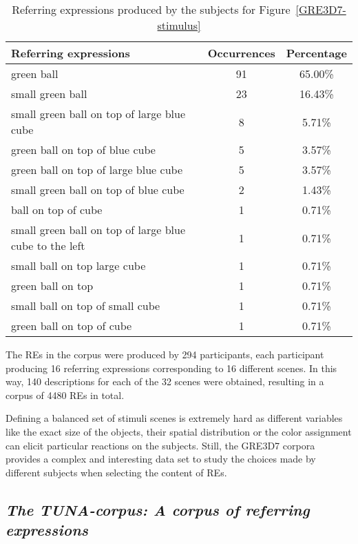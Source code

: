 \begin{table}[h!]
\begin{center}
\begin{tabular}{|l|c|c|}
\hline
Referring expressions & Occurrences & Percentage \\
\hline
green ball & 91 & 65.00\% \\
small green ball & 23 & 16.43\% \\
small green ball on top of large blue cube & 8 & 5.71\% \\
green ball on top of blue cube & 5 & 3.57\% \\
green ball on top of large blue cube & 5 & 3.57\% \\
small green ball on top of blue cube & 2 & 1.43\% \\
ball on top of cube & 1 & 0.71\% \\
small green ball on top of large blue cube to the left & 1 & 0.71\% \\
small ball on top large cube & 1 & 0.71\% \\
green ball on top & 1 & 0.71\% \\
small ball on top of small cube & 1 & 0.71\% \\
green ball on top of cube & 1 & 0.71\% \\
\hline
\end{tabular}
\caption{Referring expressions produced by the subjects for Figure~\ref{GRE3D7-stimulus}\label{corpus-distribution}}
\end{center}
\end{table}

The REs in the corpus were produced by 294 participants, each participant producing 16 referring expressions corresponding to 16 
different scenes. In this way, 140 descriptions for each of the 32 scenes were obtained, resulting in a corpus of 4480 REs in total. 

Defining a balanced set of stimuli scenes is extremely hard as different variables like the exact size of the objects, their 
spatial distribution or the color assignment can elicit particular reactions on the subjects.  Still, the GRE3D7 corpora provides
 a complex and interesting data set to study the choices made by different subjects when selecting the content of REs. 

\subsection{\textit{The TUNA-corpus: A corpus of referring expressions}}

